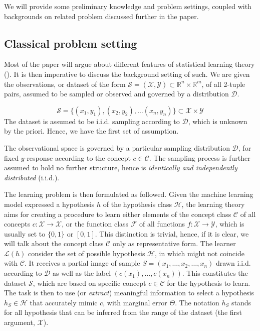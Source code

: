 \documentclass[10pt]{article}
\begin{document}
We will provide some preliminary knowledge and problem settings, coupled with backgrounds on related problem discussed further in the paper. 

\subsection{Classical problem setting}

Most of the paper will argue about different features of statistical learning theory (\cite{Sterkenburg_2024,Vapnik1999-VAPTNO,STL_Hajek_Maxim_2021}). It is then imperative to discuss the background setting of such. We are given the observations, or dataset of the form $\mathcal{S}=(\mathcal{X},\mathcal{Y})\subset \mathbb{R}^{n}\times \mathbb{R}^{m}$, of all 2-tuple pairs, assumed to be sampled or observed and governed by a distribution $\mathcal{D}$. 

\begin{equation*}
    \mathcal{S} = \{ (x_1,y_1), (x_2, y_2),\dots(x_n,y_n) \} \subset \mathcal{X}\times \mathcal{Y}
\end{equation*}
The dataset is assumed to be i.i.d. sampling according to $\mathcal{D}$, which is unknown by the priori. Hence, we have the first set of assumption. 
\begin{assumption}
The observational space is governed by a particular sampling distribution $\mathcal{D}$, for fixed $y$-response according to the concept $c\in \mathcal{C}$. The sampling process is further assumed to hold no further structure, hence is \textit{identically and independently distributed} (i.i.d.). 
\end{assumption}
\vspace{2mm}

The learning problem is then formulated as followed. Given the machine learning model expressed a hypothesis $h$ of the hypothesis class $\mathcal{H}$, the learning theory aims for creating a procedure to learn either elements of the concept class $\mathcal{C}$ of all concepts $c: \mathcal{X}\to \mathcal{X}$, or the function class $\mathcal{F}$ of all functions $f: \mathcal{X}\to \mathcal{Y}$, which is usually set to $\{0,1\}$ or $[0,1]$. This distinction is trivial, hence, if it is clear, we will talk about the concept class $\mathcal{C}$ only as representative form. The learner $\mathcal{L}(h)$ consider the set of possible hypothesis $\mathcal{H}$, in which might not coincide with $\mathcal{C}$. It receives a partial image of sample $S=(x_{1},\dots,x_{2},\dots,x_n)$ drawn i.i.d. according to $\mathcal{D}$ as well as the label $(c(x_1),\dots,c(x_n))$. This constitutes the dataset $\mathcal{S}$, which are based on specific concept $c\in \mathcal{C}$ for the hypothesis to learn. The task is then to use (or \textit{extract}) meaningful information to select a hypothesis $h_{S}\in \mathcal{H}$ that accurately mimic $c$, with marginal error $\Theta$. The notation $h_{S}$ stands for all hypothesis that can be inferred from the range of the dataset (the first argument, $\mathcal{X}$). 
\end{document}
